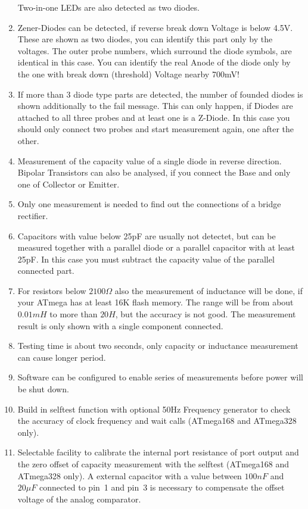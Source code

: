 \begin{enumerate}
Two-in-one LEDs are also detected as two diodes.
\item Zener-Diodes can be detected, if reverse break down Voltage is below 4.5V.
These are shown as two diodes, you can identify this part only by the voltages.
The outer probe numbers, which surround the diode symbols, are identical in this case.
You can identify the real Anode of the diode only by the one with break down (threshold) Voltage nearby 700mV!
\item If more than 3 diode type parts are detected, the number of founded diodes is shown additionally to the fail message.
 This can only happen, if Diodes are attached to all three probes and at least one is a Z-Diode.
In this case you should only connect two probes and start measurement again, one after the other.
\item Measurement of the capacity value of a single diode in reverse direction.
Bipolar Transistors can also be analysed, if you connect the Base and only one of Collector or Emitter.
\item Only one measurement is needed to find out the connections of a bridge rectifier.
\item Capacitors with value below 25pF are usually not detectet, but can be measured together with
a parallel diode or a parallel capacitor with at least 25pF.
In this case you must subtract the capacity value of the parallel connected part.
\item For resistors below \(2100 \Omega\) also the measurement of inductance will be done, if
your ATmega has at least 16K flash memory.
The range will be from about \(0.01 mH\) to more than \(20 H\), but the accuracy is not good.
The measurement result is only shown with a single component connected.
\item Testing time is about two seconds, only capacity or inductance measurement can cause longer period.
\item Software can be configured to enable series of measurements before power will be shut down.
\item Build in selftest function with optional 50Hz Frequency generator to check the accuracy of clock frequency and wait calls (ATmega168 and ATmega328 only).
\item Selectable facility to calibrate the internal port resistance of port output and
the zero offset of capacity measurement with the selftest (ATmega168 and ATmega328 only).
A external capacitor with a value between \(100 nF\) 
and \(20 \mu F\) connected to pin~1 and pin~3 is necessary to compensate the offset voltage of the analog comparator.

\end{enumerate}
